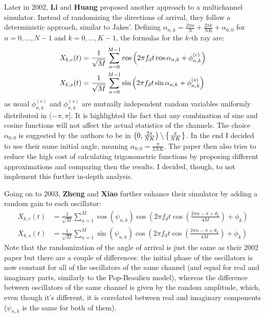 Later in 2002, \textbf{Li} and \textbf{Huang} \cite{C1} proposed another approach to a multichannel simulator. Instead of randomizing the directions of arrival, they follow a deterministic approach, similar to Jakes'. Defining $\alpha_{n,k} = \frac{2\pi n}{N} + \frac{2 \pi k}{NK} + \alpha_{0,0}$ for $n = 0,...,N-1$ and $k=0,...,K-1$, the formulas for the $k$-th ray are:%
%
\begin{subequations}
\begin{align}
X_{k,c}(t) &= \frac{1}{\sqrt{M}} \sum_{n=0}^{M-1} \cos \qty( 2\pi f_d t \cos \alpha_{n,k} + \phi_{n,k}^{(c)} )\\
X_{k,s}(t) &= \frac{1}{\sqrt{M}} \sum_{n=0}^{M-1} \sin \qty( 2\pi f_d t \sin \alpha_{n,k} + \phi_{n,k}^{(s)} )
\end{align}
\end{subequations}%
%
as usual $\phi_{n,k}^{(c)}$ and $\phi_{n,k}^{(s)}$ are mutually independent random variables uniformly distributed in $(-\pi,\pi]$. It is highlighted the fact that any combination of sine and cosine functions will not affect the actual statistics of the channels. The choice $\alpha_{0,0}$ is suggested by the authors to be in $\qty(0,\frac{2\pi}{NK}) \setminus \qty{\frac{\pi}{NK}}$. In the end I decided to use their same initial angle, meaning $\alpha_{0,0} = \frac{\pi}{2NK}$. The paper then also tries to reduce the high cost of calculating trigonometric functions by proposing different approximations and comparing then the results. I decided, though, to not implement this further in-depth analysis.

Going on to 2003, \textbf{Zheng} and \textbf{Xiao} \cite{A2} further enhance their simulator by adding a random gain to each oscillator:%
%
\begin{subequations}
\begin{align}
X_{k,c}(t) &= \frac{1}{\sqrt{M}} \sum_{n=1}^{M} \cos(\psi_{n,k})\cos \left( 2\pi f_d t \cos \left( \frac{2\pi n - \pi + \theta_k}{4M}\right) + \phi_k \right)\\
X_{k,s}(t) &= \frac{1}{\sqrt{M}} \sum_{n=1}^{M} \sin(\psi_{n,k})\cos \left( 2\pi f_d t \cos \left( \frac{2\pi n - \pi + \theta_k}{4M}\right) + \phi_k \right)
\end{align}
\end{subequations}%
%
Note that the randomization of the angle of arrival is just the same as their 2002 paper but there are a couple of differences: the initial phase of the oscillators is now constant for all of the oscillators of the same channel (and equal for real and imaginary parts, similarly to the Pop-Beaulieu model), whereas the difference between oscillators of the same channel is given by the random amplitude, which, even though it's different, it is correlated between real and imaginary components ($\psi_{n,k}$ is the same for both of them).

